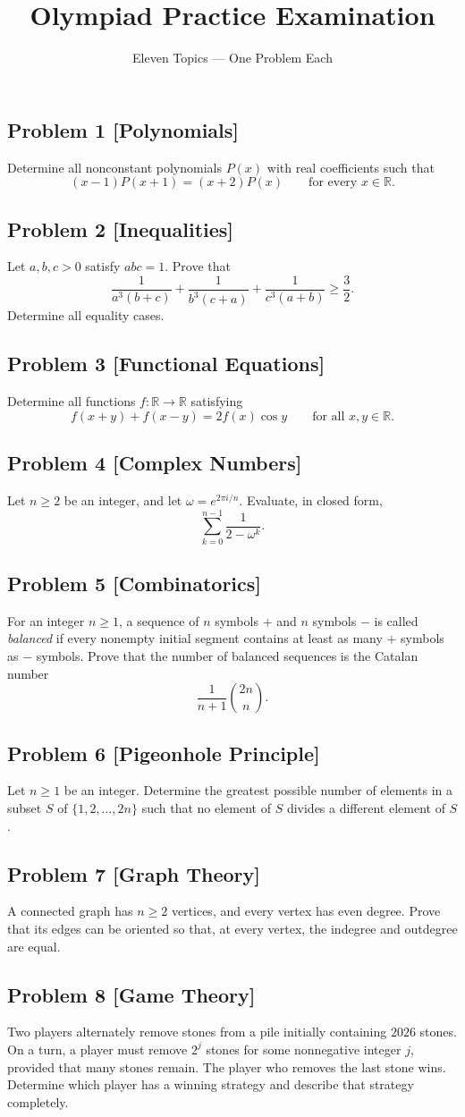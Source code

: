 \documentclass[11pt,a4paper]{article}
\title{\vspace{-1.5cm}\bfseries Olympiad Practice Examination}
\author{Eleven Topics --- One Problem Each}
\date{}
\newcommand{\problem}[3]{%
  \subsection*{Problem #1 \; \textnormal{\small[#2]}}\label{prob:#3}%
}
\newcommand{\RR}{\mathbb{R}}
\begin{document}
\maketitle
\vspace{-1.8em}

\begin{center}
\end{center}

\problem{1}{Polynomials}{polynomials}
Determine all nonconstant polynomials $P(x)$ with real coefficients such that
\[
  (x-1)P(x+1)=(x+2)P(x)
  \qquad\text{for every }x\in\RR.
\]

\problem{2}{Inequalities}{inequalities}
Let $a,b,c>0$ satisfy $abc=1$. Prove that
\[
  \frac{1}{a^3(b+c)}+\frac{1}{b^3(c+a)}
  +\frac{1}{c^3(a+b)}\ge\frac32.
\]
Determine all equality cases.

\problem{3}{Functional Equations}{functional-equations}
Determine all functions $f:\RR\to\RR$ satisfying
\[
  f(x+y)+f(x-y)=2f(x)\cos y
  \qquad\text{for all }x,y\in\RR.
\]

\problem{4}{Complex Numbers}{complex-numbers}
Let $n\ge2$ be an integer, and let $\omega=e^{2\pi i/n}$. Evaluate, in closed form,
\[
  \sum_{k=0}^{n-1}\frac{1}{2-\omega^k}.
\]

\problem{5}{Combinatorics}{combinatorics}
For an integer $n\ge1$, a sequence of $n$ symbols $+$ and $n$ symbols $-$ is called \emph{balanced} if every nonempty initial segment contains at least as many $+$ symbols as $-$ symbols. Prove that the number of balanced sequences is the Catalan number
\[
  \frac{1}{n+1}\binom{2n}{n}.
\]

\problem{6}{Pigeonhole Principle}{pigeonhole}
Let $n\ge1$ be an integer. Determine the greatest possible number of elements in a subset $S$ of $\{1,2,\ldots,2n\}$ such that no element of $S$ divides a different element of $S$.

\problem{7}{Graph Theory}{graph-theory}
A connected graph has $n\ge2$ vertices, and every vertex has even degree. Prove that its edges can be oriented so that, at every vertex, the indegree and outdegree are equal.

\problem{8}{Game Theory}{game-theory}
Two players alternately remove stones from a pile initially containing $2026$ stones. On a turn, a player must remove $2^j$ stones for some nonnegative integer $j$, provided that many stones remain. The player who removes the last stone wins. Determine which player has a winning strategy and describe that strategy completely.
\end{document}
